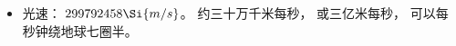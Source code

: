 
\begin{issues}
\issueDraft
\end{issues}

\begin{itemize}
\item 光速： $299792458\Si{m/s}$。 约三十万千米每秒， 或三亿米每秒， 可以每秒钟绕地球七圈半。
\end{itemize}

